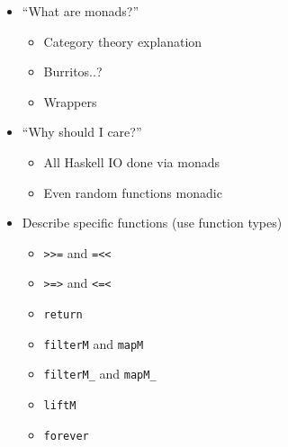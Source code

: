 \documentclass{scrarticle}
\begin{document}
    \begin{itemize}
        \item ``What are monads?''
        \begin{itemize}
            \item Category theory explanation
            \item Burritos..?
            \item Wrappers
        \end{itemize}
        \item ``Why should I care?''
        \begin{itemize}
            \item All Haskell IO done via monads
            \item Even random functions monadic
        \end{itemize}
        \item Describe specific functions (use function types)
        \begin{itemize}
            \item \texttt{>>=} and \texttt{=<<}
            \item \texttt{>=>} and \texttt{<=<}
            \item \texttt{return}
            \item \texttt{filterM} and \texttt{mapM}
            \item \texttt{filterM\_} and \texttt{mapM\_}
            \item \texttt{liftM}
            \item \texttt{forever}
        \end{itemize}
    \end{itemize}
\end{document}
